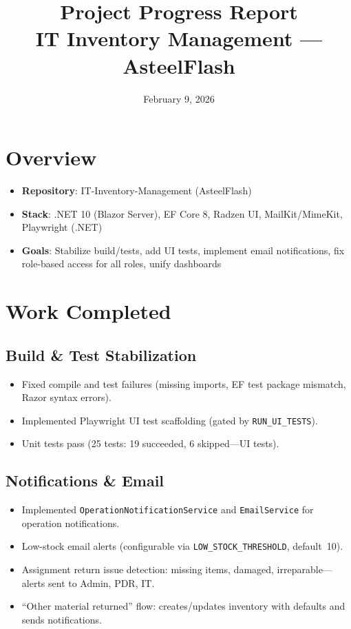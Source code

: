 \documentclass[11pt,a4paper]{article}
\title{Project Progress Report\\[0.5em]\large IT Inventory Management --- AsteelFlash}
\date{February 9, 2026}
\begin{document}
\maketitle
\tableofcontents
\newpage

\section{Overview}
\begin{itemize}
  \item \textbf{Repository}: IT-Inventory-Management (AsteelFlash)
  \item \textbf{Stack}: .NET 10 (Blazor Server), EF Core 8, Radzen UI, MailKit/MimeKit, Playwright (.NET)
  \item \textbf{Goals}: Stabilize build/tests, add UI tests, implement email notifications, fix role-based access for all roles, unify dashboards
\end{itemize}

\section{Work Completed}

\subsection{Build \& Test Stabilization}
\begin{itemize}
  \item Fixed compile and test failures (missing imports, EF test package mismatch, Razor syntax errors).
  \item Implemented Playwright UI test scaffolding (gated by \texttt{RUN\_UI\_TESTS}).
  \item Unit tests pass (25 tests: 19 succeeded, 6 skipped---UI tests).
\end{itemize}

\subsection{Notifications \& Email}
\begin{itemize}
  \item Implemented \texttt{OperationNotificationService} and \texttt{EmailService} for operation notifications.
  \item Low-stock email alerts (configurable via \texttt{LOW\_STOCK\_THRESHOLD}, default~10).
  \item Assignment return issue detection: missing items, damaged, irreparable---alerts sent to Admin, PDR, IT.
  \item ``Other material returned'' flow: creates/updates inventory with defaults and sends notifications.
\end{itemize}
\end{document}
